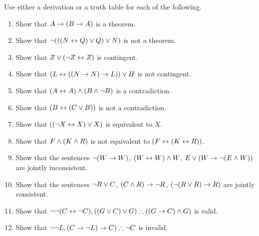 \noindent\problempart Use either a derivation or a truth table for each of the following.
\begin{enumerate}%
\item Show that $A \rightarrow (B \rightarrow A)$ is a theorem.
\item Show that $\neg (((N \leftrightarrow Q) \vee Q) \vee N)$ is not a theorem.
\item Show that $ Z \vee (\neg Z \leftrightarrow Z) $ is contingent.
\item Show that $ (L \leftrightarrow ((N \rightarrow N) \rightarrow L)) \vee H $ is not contingent.
\item Show that $ (A \leftrightarrow A) \wedge (B \wedge \neg B)$ is a contradiction.
\item Show that $ (B \leftrightarrow (C \vee B)) $ is not a contradiction.
\item Show that $ ((\neg X \leftrightarrow X) \vee X) $ is equivalent to $X$.
\item Show that $F \wedge (K \wedge R) $ is not equivalent to $ (F \leftrightarrow (K \leftrightarrow R)) $.
\item Show that the sentences $ \neg (W \rightarrow W)$, $(W \leftrightarrow W) \wedge W$, $E \vee (W \rightarrow \neg (E \wedge W))$ are jointly inconsistent.
\item Show that the sentences  $\neg R \vee C $, $(C \wedge R) \rightarrow \neg R$, $(\neg (R \vee R) \rightarrow R) $ are jointly consistent.
\item Show that $\enot \enot (C \eiff \enot C), ((G \eor C) \eor G) \therefore ((G \eif C) \eand G) $ is valid.
\item Show that $ \enot \enot L,  (C \eif \enot L) \eif C) \therefore \enot C$ is invalid.
\end{enumerate}

